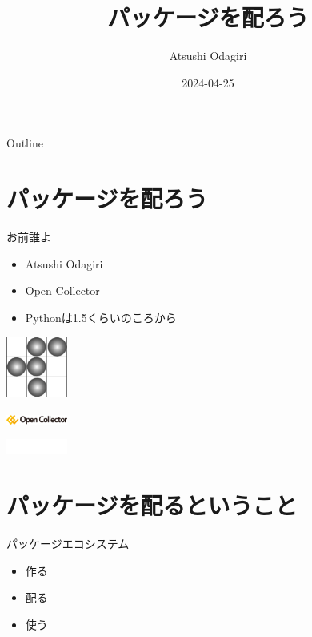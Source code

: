 \documentclass[presentation]{beamer}
\author{Atsushi Odagiri}
\date{2024-04-25}
\title{パッケージを配ろう}
\begin{document}
\maketitle
\begin{frame}{Outline}
\tableofcontents
\end{frame}

\section{パッケージを配ろう}
\label{sec:org31595d1}
\begin{frame}[label={sec:org90ce0fb}]{お前誰よ}
\begin{block}{}
\begin{itemize}
\item Atsushi Odagiri
\item Open Collector
\item Pythonは1.5くらいのころから
\end{itemize}
\end{block}

\begin{block}{}
\begin{center}
\includegraphics[width=2cm]{./r-penta512.png}
\end{center}

\begin{center}
\includegraphics[width=2cm]{./oc-logo.png}
\end{center}
\begin{center}
\includegraphics[width=2cm]{./logo-w.png}
\end{center}
\end{block}
\end{frame}
\section{パッケージを配るということ}
\label{sec:org790f4bd}
\begin{frame}[label={sec:org67619a1}]{パッケージエコシステム}
\begin{itemize}
\item 作る
\item 配る
\item 使う
\end{itemize}
\end{frame}
\end{document}
